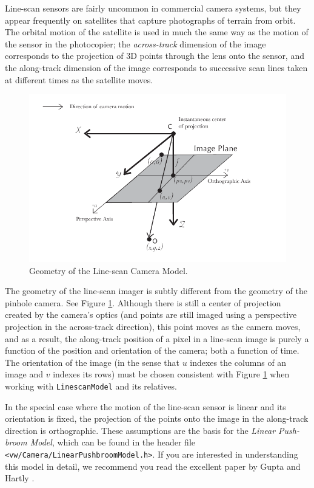Line-scan sensors are fairly uncommon in commercial camera systems, but
they appear frequently on satellites that capture photographs of
terrain from orbit.  The orbital motion of the satellite is used in
much the same way as the motion of the sensor in the photocopier; the
{\em across-track} dimension of the image corresponds to the
projection of 3D points through the lens onto the sensor, and the
along-track dimension of the image corresponds to successive scan lines
taken at different times as the satellite moves.

\begin{figure}[tbp]
\begin{center}
  \includegraphics[width=6in]{images/linescan_geometry.pdf}
 \end{center}
  \caption{Geometry of the Line-scan Camera Model.}
  \label{fig:linescan-geometry}
\end{figure}

The geometry of the line-scan imager is subtly different from the
geometry of the pinhole camera.  See Figure
\ref{fig:linescan-geometry}.  Although there is still a center of
projection created by the camera's optics (and points are still imaged
using a perspective projection in the across-track direction), this
point moves as the camera moves, and as a result, the along-track
position of a pixel in a line-scan image is purely a function of the
position and orientation of the camera; both a function of time.  The
orientation of the image (in the sense that $u$ indexes the columns of
an image and $v$ indexes its rows) must be chosen consistent with
Figure \ref{fig:linescan-geometry} when working with
\verb#LinescanModel# and its relatives.

In the special case where the motion of the line-scan sensor is linear
and its orientation is fixed, the projection of the points onto the
image in the along-track direction is orthographic.  These assumptions
are the basis for the {\em Linear Push-broom Model}, which can be found
in the header file \verb#<vw/Camera/LinearPushbroomModel.h>#.  If you
are interested in understanding this model in detail, we recommend you
read the excellent paper by Gupta and Hartly \cite{gupta97}.

